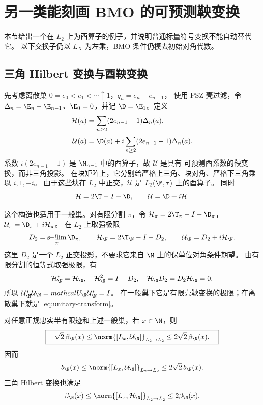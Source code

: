 \section{另一类能刻画 BMO 的可预测鞅变换}\label{sec:unitary-transform}

本节给出一个在 $L_2$ 上为酉算子的例子，并说明普通标量符号变换不能自动替代它。
以下交换子仍以 $L_X$ 为左乘，BMO 条件仍模去初始对角代数。

\subsection{三角 Hilbert 变换与酉鞅变换}

先考虑离散巢 $0=e_0<e_1<\cdots\uparrow1$，$q_n=e_n-e_{n-1}$，
使用 PSZ 壳过滤，令 $\Delta_n=\E_n-\E_{n-1}$、$\E_0=0$，并记
$\D=\E_1$。定义
\begin{align}
 \mathcal H(a)
 &=\sum_{n\geq2}(2e_{n-1}-1)\Delta_n(a),\label{eq:hilbert-transform}\\
 \mathcal U(a)
 &=\D(a)+i\sum_{n\geq2}(2e_{n-1}-1)\Delta_n(a).
       \label{eq:unitary-transform}
\end{align}
系数 $i(2e_{n-1}-1)$ 是 $\M_{n-1}$ 中的酉算子，故 $\mathcal U$ 是具有
可预测酉系数的鞅变换，而非三角投影。
在块矩阵上，它分别给严格上三角、块对角、严格下三角乘以 $i,1,-i$。
由于这些块在 $L_2$ 中正交，$\mathcal U$ 是 $L_2(\M,\tau)$ 上的酉算子。
同时
\[
 \mathcal H=2\T-I-\D,\qquad \mathcal U=\D+i\mathcal H.
\]

这个构造也适用于一般巢。对有限分割 $\pi$，令
$\mathcal H_\pi=2\T_\pi-I-\D_\pi$，
$\mathcal U_\pi=\D_\pi+i\mathcal H_\pi$。
在 $L_2$ 上取强极限
\[
 D_2=\mathop{\mathrm{s\!-!lim}}_\pi\D_\pi,\qquad
 \mathcal H_\N=2\T_\N-I-D_2,\qquad
 \mathcal U_\N=D_2+i\mathcal H_\N.
\]
这里 $D_2$ 是一个 $L_2$ 正交投影，不要求它来自 $\M$ 上的保单位对角条件期望。
由有限分割的恒等式取强极限，有
\[
 \mathcal H_\N^*=\mathcal H_\N,\quad
 \mathcal H_\N^2=I-D_2,\quad
 \mathcal H_\N D_2=D_2\mathcal H_\N=0.
\]
所以 $\mathcal U_\N^*\mathcal U_\N=mathcal U_\N\mathcal U_\N^*=I$。
在一般巢下它是有限壳鞅变换的极限；在离散巢下就是 \eqref{eq:unitary-transform}。

\begin{theorem}\label{thm:unitary-bmo}
对任意正规忠实半有限迹和上述一般巢，若 $x\in\M$，则
\begin{equation}\label{eq:unitary-beta}
 \boxed{\quad
 \sqrt2\,\beta_\N(x)
 \leq\norm{[L_x,\mathcal U_\N]}_{L_2\to L_2}
 \leq2\sqrt2\,\beta_\N(x).
 \quad}
\end{equation}
因而
\begin{equation}\label{eq:unitary-bmo}
 b_\N(x)\leq\norm{[L_x,\mathcal U_\N]}_{L_2\to L_2}
       \leq2\sqrt2\,b_\N(x).
\end{equation}
三角 Hilbert 变换也满足
\[
 \beta_\N(x)\leq\norm{[L_x,\mathcal H_\N]}_{L_2\to L_2}
       \leq2\beta_\N(x).
\]
\end{theorem}

